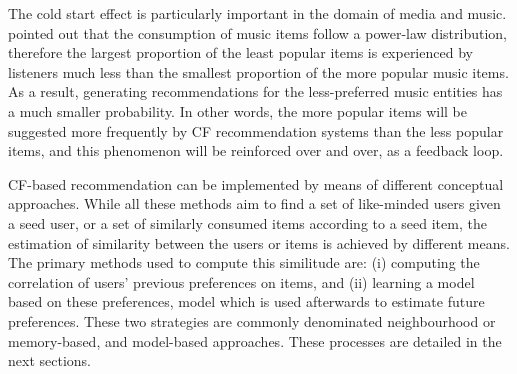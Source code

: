 The cold start effect is particularly important in the domain of media and music. \textcite{celma10music} pointed out that the consumption of music items follow a power-law distribution, therefore the largest proportion of the least popular items is experienced by listeners much less than the smallest proportion of the more popular music items. As a result, generating recommendations for the less-preferred music entities has a much smaller probability. In other words, the more popular items will be suggested more frequently by CF recommendation systems than the less popular items, and this phenomenon will be reinforced over and over, as a feedback loop.




CF-based recommendation can be implemented by means of different conceptual approaches. 
While all these methods aim to find a set of like-minded users given a seed user, or a set of similarly consumed items according to a seed item, the estimation of similarity between the users or items is achieved by different means.
The primary methods used to compute this similitude are: (i) computing the correlation of users' previous preferences on items, and (ii) learning a model based on these preferences, model which is used afterwards to estimate future preferences. These two strategies are commonly denominated neighbourhood or memory-based,  and model-based approaches. These processes are detailed in the next sections.



